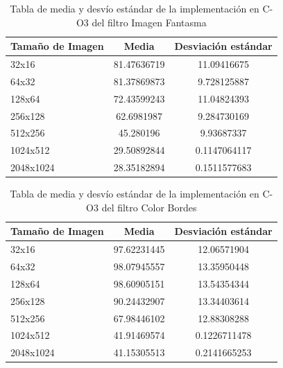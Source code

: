 \documentclass[a4paper]{article}
\begin{document}
\begin{table}[h!]
	\begin{center}
		\begin{tabular}{| l | c | c |}
			\hline
			Tamaño de Imagen & Media & Desviación estándar \\ \hline
			32x16	& 81.47636719	& 11.09416675 \\
			64x32	& 81.37869873	& 9.728125887 \\
			128x64	& 72.43599243	& 11.04824393 \\
			256x128	& 62.6981987	& 9.284730169 \\
			512x256	& 45.280196	& 9.93687337 \\
			1024x512 & 29.50892844	& 0.1147064117 \\
			2048x1024 & 28.35182894	& 0.1511577683 \\ \hline
		\end{tabular}
		\caption{Tabla de media y desvío estándar de la implementación en C-O3 del filtro Imagen Fantasma}
	\end{center}
\end{table}

\begin{table}[h!]
	\begin{center}
		\begin{tabular}{| l | c | c |}
			\hline
			Tamaño de Imagen & Media & Desviación estándar \\ \hline
			32x16	& 97.62231445	& 12.06571904 \\
			64x32	& 98.07945557	& 13.35950448 \\ 
			128x64	& 98.60905151	& 13.54354344 \\
			256x128	& 90.24432907	& 13.34403614 \\
			512x256	& 67.98446102	& 12.88308288 \\
			1024x512 & 41.91469574	& 0.1226711478 \\
			2048x1024 &41.15305513	& 0.2141665253 \\ \hline
		\end{tabular}
		\caption{Tabla de media y desvío estándar de la implementación en C-O3 del filtro Color Bordes}
	\end{center}
\end{table}
\end{document}
